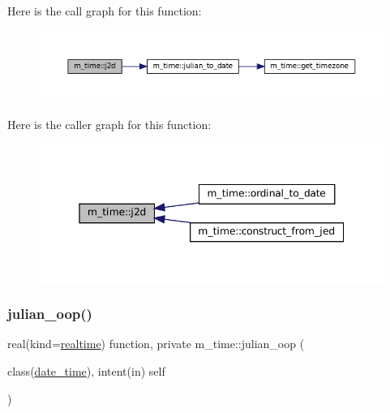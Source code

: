 Here is the call graph for this function\+:\nopagebreak
\begin{figure}[H]
\begin{center}
\leavevmode
\includegraphics[width=350pt]{namespacem__time_a3ad5cad6df02c53e0429c3602a072e3c_cgraph}
\end{center}
\end{figure}
Here is the caller graph for this function\+:\nopagebreak
\begin{figure}[H]
\begin{center}
\leavevmode
\includegraphics[width=345pt]{namespacem__time_a3ad5cad6df02c53e0429c3602a072e3c_icgraph}
\end{center}
\end{figure}
\mbox{\label{namespacem__time_aff0a1b524b578e85efe20b87fbe9db61}} 
\subsubsection{\texorpdfstring{julian\+\_\+oop()}{julian\_oop()}}
{\footnotesize\ttfamily real(kind=\mbox{\hyperlink{namespacem__time_ac10ea9e8d59ec74eaa7d89f2517d7422}{realtime}}) function, private m\+\_\+time\+::julian\+\_\+oop (\begin{DoxyParamCaption}\item[{class(\mbox{\hyperlink{structm__time_1_1date__time}{date\+\_\+time}}), intent(in)}]{self }\end{DoxyParamCaption})\hspace{0.3cm}{\ttfamily [private]}}



